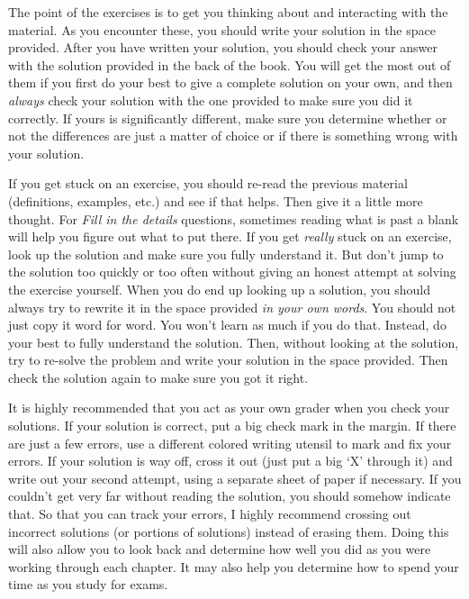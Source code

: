 The point of the exercises is to get you thinking about and interacting with the material.  
As you encounter these, you should write your solution in the space provided.  After you have written
your solution, you should check your answer with the solution provided in the back of the book.  
You will get the most out of them if you first do your
best to give a complete solution on your own, and then {\em always} check your solution with the one provided
to make sure you did it correctly.  If yours is significantly different, make sure you determine whether or
not the differences are just a matter of choice or if there is something wrong with your solution.

If you get stuck on an exercise, you should re-read the previous material 
(definitions, examples, etc.) and see if that helps.  Then give it a little more thought.  
For {\em Fill in the details} questions, sometimes reading what is past a blank will help you
figure out what to put there.
If you get {\em really} stuck on an exercise, look up the solution and make sure you fully understand it.  
But don't jump to the solution too quickly or too often without giving an honest attempt at solving the exercise
yourself.  When you do end up looking up a solution, you should always try to rewrite it in the
space provided {\em in your own words}.  
You should not just copy it word for word. You won't learn as 
much if you do that.  Instead, do your best to fully understand the solution.  Then, without looking
at the solution, try to re-solve the problem and write your solution in the space provided.  
Then check the solution again to make sure you got it right.

It is highly recommended that you act as your own grader when you check your solutions.
If your solution is correct, put a big check mark in the margin.  
If there are just a few errors, 
use a different colored writing utensil to mark and fix your errors.
If your solution is way off, cross it out (just put a big `X' through it) 
and write out your second attempt, using a separate sheet of paper if necessary. 
If you couldn't get very far without reading the solution, you should somehow indicate that. 
So that you can track your errors, I highly recommend crossing out incorrect solutions
(or portions of solutions) instead of erasing them.  
Doing this will also allow you to look back and determine how well you did as you were working
through each chapter.  
It may also help you determine how to spend your time as you study for exams. 

